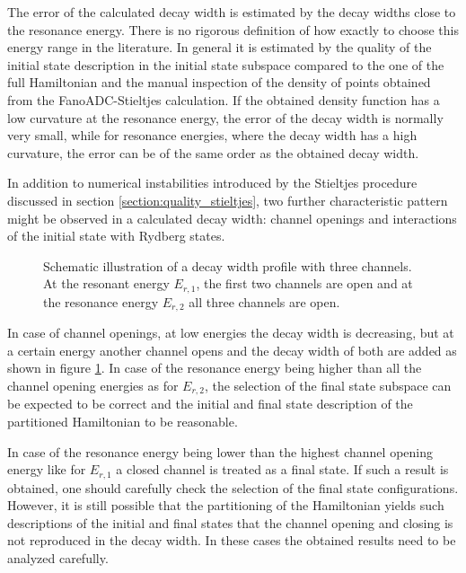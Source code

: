 The error of the calculated decay width is estimated by the decay widths
close to the resonance energy.
There is no rigorous definition
of how exactly to choose this energy range in the literature. 
In general it is estimated
by the quality of the initial state description in the initial
state subspace compared to the one of the full Hamiltonian and the
manual inspection of the density of points obtained
from the FanoADC-Stieltjes calculation. If
the obtained density function has a low curvature at the resonance energy,
the error of the decay width is normally very small, while for resonance
energies, where the decay width has a high curvature, the error can be of the same
order as the obtained decay width.

In addition to numerical instabilities introduced by the Stieltjes procedure
discussed in section \ref{section:quality_stieltjes},
two further characteristic pattern might be observed in a calculated
decay width: channel openings and interactions of the initial state
with Rydberg states.


\begin{figure}[h]
  \centering
  
  \caption{Schematic illustration of a decay width profile with three
           channels. At the resonant energy $E_{r,1}$, the first two channels
           are open and at the resonance energy $E_{r,2}$ all three channels
           are open.}
  \label{figure:prof_channel_opening}
\end{figure}
In case of channel openings, at low energies the decay width is decreasing, but
at a certain energy another channel opens and the decay width of both are
added as shown in figure \ref{figure:prof_channel_opening}. In case of the
resonance energy being higher than all the channel opening energies as for
$E_{r,2}$, the
selection of the final state subspace can be expected to be correct
and the initial
and final state description of the partitioned Hamiltonian to be reasonable.

In case of the resonance energy being lower than the highest channel
opening energy like for $E_{r,1}$ a closed channel is treated as a final
state. If such a result is obtained, one should carefully check the selection
of the final state configurations. However, it is still possible that the
partitioning of the Hamiltonian yields such descriptions of the initial and
final states that the channel opening and closing is not reproduced in the
decay width. In these cases the obtained results need to be analyzed carefully.

